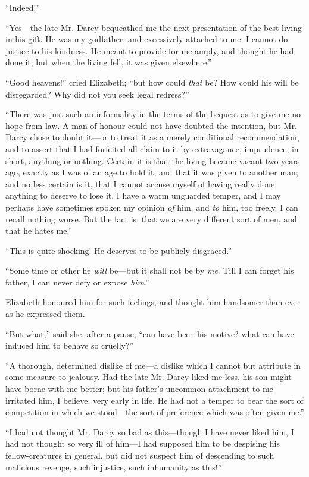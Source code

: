 \documentclass[12pt,openright]{book}
\begin{document}
“Indeed!”

“Yes—the late Mr. Darcy bequeathed me the next presentation of the best living in his gift. He was my godfather, and excessively attached to me. I cannot do justice to his kindness. He meant to provide for me amply, and thought he had done it; but when the living fell, it was given elsewhere.”

“Good heavens!” cried Elizabeth; “but how could \textit{that} be? How could his will be disregarded? Why did not you seek legal redress?”

“There was just such an informality in the terms of the bequest as to give me no hope from law. A man of honour could not have doubted the intention, but Mr. Darcy chose to doubt it—or to treat it as a merely conditional recommendation, and to assert that I had forfeited all claim to it by extravagance, imprudence, in short, anything or nothing. Certain it is that the living became vacant two years ago, exactly as I was of an age to hold it, and that it was given to another man; and no less certain is it, that I cannot accuse myself of having really done anything to deserve to lose it. I have a warm unguarded temper, and I may perhaps have sometimes spoken my opinion \textit{of} him, and \textit{to} him, too freely. I can recall nothing worse. But the fact is, that we are very different sort of men, and that he hates me.”

“This is quite shocking! He deserves to be publicly disgraced.”

“Some time or other he \textit{will} be—but it shall not be by \textit{me}. Till I can forget his father, I can never defy or expose \textit{him}.”

Elizabeth honoured him for such feelings, and thought him handsomer than ever as he expressed them.

“But what,” said she, after a pause, “can have been his motive? what can have induced him to behave so cruelly?”

“A thorough, determined dislike of me—a dislike which I cannot but attribute in some measure to jealousy. Had the late Mr. Darcy liked me less, his son might have borne with me better; but his father’s uncommon attachment to me irritated him, I believe, very early in life. He had not a temper to bear the sort of competition in which we stood—the sort of preference which was often given me.”

“I had not thought Mr. Darcy so bad as this—though I have never liked him, I had not thought so very ill of him—I had supposed him to be despising his fellow-creatures in general, but did not suspect him of descending to such malicious revenge, such injustice, such inhumanity as this!”
\end{document}
